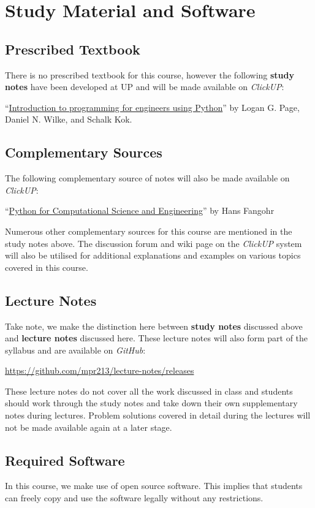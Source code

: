 \section{Study Material and Software}
    \subsection{Prescribed Textbook}
        There is no prescribed textbook for this course, however the following
        \textbf{study notes} have been developed at UP and will be made
        available on {\it ClickUP}:

        ``\underline{Introduction to programming for engineers using Python}''
        by Logan G. Page, Daniel N. Wilke, and Schalk Kok.

    \subsection{Complementary Sources}
        The following complementary source of notes will also be made available
        on {\it ClickUP}:

        ``\underline{Python for Computational Science and Engineering}'' by
        Hans Fangohr

        Numerous other complementary sources for this course are mentioned in
        the study notes above. The discussion forum and wiki page on the {\it
        ClickUP} system will also be utilised for additional explanations and
        examples on various topics covered in this course.

    \subsection{Lecture Notes}
        Take note, we make the distinction here between \textbf{study notes}
        discussed above and \textbf{lecture notes} discussed here. These
        lecture notes will also form part of the syllabus and are available on
        \textit{GitHub}:

        \url{https://github.com/mpr213/lecture-notes/releases}

        These lecture notes do not cover all the work discussed in class and
        students should work through the study notes and take down their own
        supplementary notes during lectures. Problem solutions covered in
        detail during the lectures will not be made available again at a later
        stage.

    \subsection{Required Software}
        In this course, we make use of open source software. This implies that
        students can freely copy and use the software legally without any
        restrictions.

